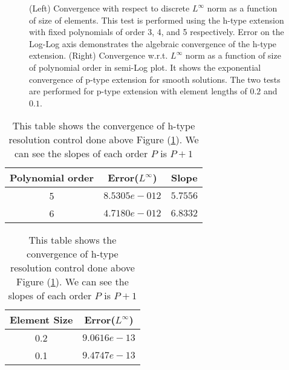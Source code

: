 \begin{figure}[h]
\begin{center}
  \caption{\label{ScrvconvDN} (Left) Convergence with
respect to discrete $L^{\infty}$ norm as a function of size of
elements. This test is performed using the h-type extension with
fixed polynomials of order 3, 4, and 5 respectively. Error on the
Log-Log axis demonstrates the algebraic convergence of the h-type
extension. (Right) Convergence w.r.t. $L^{\infty}$ norm as a
function of size of polynomial order in semi-Log plot. It shows
the exponential convergence of p-type extension for smooth
solutions. The two tests are performed for p-type extension with
element lengths of $0.2$ and $0.1$. }
\end{center}
\end{figure}

\begin{table}[h]
\centering \caption{\label{hconv2t} This table shows the
convergence of h-type resolution control done above Figure
(\ref{ScrvconvDN}). We can see the slopes of each order $P$ is
$P+1$ }
\begin{tabular}{|c|c|c|} \hline
    Polynomial order&Error($L^{\infty}$)&Slope   \\ \hline \hline
    5&$8.5305e-012$ &$5.7556$ \\ \hline
    6&$4.7180e-012$ &$6.8332$ \\ \hline
\end{tabular}
\hspace{.5in}
\begin{tabular}{|c|c|} \hline
    {Element Size}&Error($L^{\infty}$) \\ \hline \hline
    0.2&$9.0616e-13$  \\ \hline
    0.1&$9.4747e-13$ \\ \hline
\end{tabular}
\end{table}
